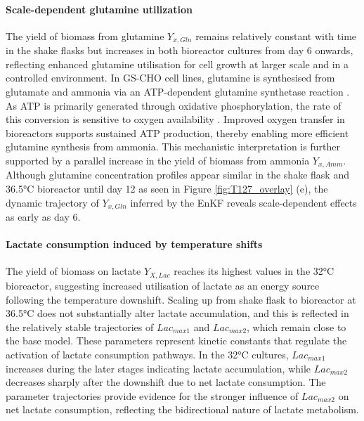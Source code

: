 \paragraph{Scale-dependent glutamine utilization}

The yield of biomass from glutamine $Y_{x,Gln}$ remains relatively constant with time in the shake flasks but increases in both bioreactor cultures from day 6 onwards, reflecting enhanced glutamine utilisation for cell growth at larger scale and in a controlled environment. In GS-CHO cell lines, glutamine is synthesised from glutamate and ammonia via an ATP-dependent glutamine synthetase reaction \cite{Lin2019AttenuatedBiologics}. As ATP is primarily generated through oxidative phosphorylation, the rate of this conversion is sensitive to oxygen availability \cite{Wilson2017OxidativeMetabolism}. Improved oxygen transfer in bioreactors supports sustained ATP production, thereby enabling more efficient glutamine synthesis from ammonia. This mechanistic interpretation is further supported by a parallel increase in the yield of biomass from ammonia $Y_{x,Amm}$. Although glutamine concentration profiles appear similar in the shake flask and 36.5°C bioreactor until day 12 as seen in Figure \ref{fig:T127_overlay} (e), the dynamic trajectory of $Y_{x,Gln}$ inferred by the EnKF reveals scale-dependent effects as early as day 6. 


\paragraph{Lactate consumption induced by temperature shifts}

The yield of biomass on lactate $Y_{X,Lac}$ reaches its highest values in the 32°C bioreactor, suggesting increased utilisation of lactate as an energy source following the temperature downshift. Scaling up from shake flask to bioreactor at 36.5°C does not substantially alter lactate accumulation, and this is reflected in the relatively stable trajectories of $Lac_{max1}$ and $Lac_{max2}$, which remain close to the base model. These parameters represent kinetic constants that regulate the activation of lactate consumption pathways. In the 32°C cultures, $Lac_{max1}$ increases during the later stages indicating lactate accumulation, while $Lac_{max2}$ decreases sharply after the downshift due to net lactate consumption. The parameter trajectories provide evidence for the stronger influence of $Lac_{max2}$ on net lactate consumption, reflecting the bidirectional nature of lactate metabolism.

